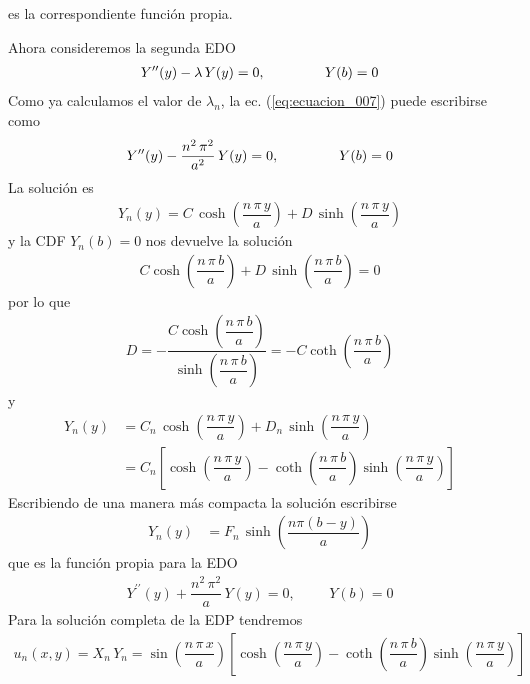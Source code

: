 es la correspondiente función propia.
\par
Ahora consideremos la segunda EDO
\begin{align}
Y^{\prime \prime} (y) - \lambda \,  Y(y) = 0, \hspace{1.5cm} Y(b) = 0
\label{eq:ecuacion_007}
\end{align}
Como ya calculamos el valor de $\lambda_{n}$, la ec. (\ref{eq:ecuacion_007}) puede escribirse como
\begin{align*}
Y^{\prime \prime} (y) -  \dfrac{n^{2} \, \pi^{2}}{a^{2}} \,  Y(y) = 0, \hspace{1.5cm} Y(b) = 0
\end{align*}
La solución es
\begin{align*}
Y_{n} (y) = C \, \cosh \left( \dfrac{n \, \pi \, y}{a} \right) + D \, \sinh \left( \dfrac{n \, \pi \, y}{a} \right)
\end{align*}
y la CDF $Y_{n}(b) = 0$ nos devuelve la solución
\begin{align*}
C \cosh \left( \dfrac{n \, \pi \, b}{a} \right) + D \, \sinh \left( \dfrac{n \, \pi \, b}{a} \right) = 0
\end{align*}
por lo que
\begin{align*}
D = - \dfrac{C \cosh \left( \dfrac{n \, \pi \, b}{a} \right)}{\sinh \left( \dfrac{n \, \pi \, b}{a} \right)} = - C \coth \left( \dfrac{n \, \pi \, b}{a} \right)
\end{align*}
y
\begin{align*}
Y_{n}(y) &= C_{n} \, \cosh \left( \dfrac{n \, \pi \, y}{a} \right) + D_{n} \, \sinh \left( \dfrac{n \, \pi \, y}{a} \right) \\
&= C_{n} \left[ \cosh \left( \dfrac{n \, \pi \, y}{a} \right) - \coth \left( \dfrac{n \, \pi \, b}{a} \right) \sinh \left( \dfrac{n \, \pi \, y}{a} \right) \right]
\end{align*}
Escribiendo de una manera más compacta la solución escribirse
\begin{align*}
Y_{n}(y) &= F_{n} \, \sinh \left( \dfrac{n \pi (b - y)}{a} \right)
\end{align*}
que es la función propia para la EDO
\begin{align*}
Y^{\prime \prime} (y) + \dfrac{n^{2} \, \pi^{2}}{a} \, Y(y) = 0, \hspace{1cm} Y(b) = 0
\end{align*}
Para la solución completa de la EDP tendremos
\begin{align*}
u_{n} (x, y) = X_{n} \, Y_{n} = \sin \left( \dfrac{n \, \pi \, x}{a} \right) \left[  \cosh \left( \dfrac{n \, \pi \, y}{a} \right) - \coth \left( \dfrac{n \, \pi \, b}{a} \right) \sinh \left( \dfrac{n \, \pi \, y}{a} \right) \right]
\end{align*}
